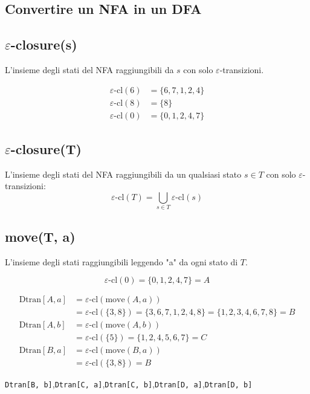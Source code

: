 \subsection{Convertire un NFA in un DFA}

\subsection*{$\varepsilon$-closure(s)}
L'insieme degli stati del NFA raggiungibili da $s$ con solo $\varepsilon$-transizioni.

\begin{align*}
  \varepsilon\text{-cl}(6) &= \{6, 7, 1, 2, 4\} \\
  \varepsilon\text{-cl}(8) &= \{8\} \\
  \varepsilon\text{-cl}(0) &= \{0, 1, 2, 4, 7\}
\end{align*}

\subsection*{$\varepsilon$-closure(T)}
L'insieme degli stati del NFA raggiungibili da un qualsiasi stato $s \in T$ con solo $\varepsilon$-transizioni:
\[
\varepsilon\text{-cl}(T) = \bigcup_{s \in T} \varepsilon\text{-cl}(s)
\]

\subsection*{move(T, a)}
L'insieme degli stati raggiungibili leggendo "a" da ogni stato di $T$.

\[
\varepsilon\text{-cl}(0) = \{0, 1, 2, 4, 7\} = A
\]

\begin{align*}
  \mathrm{Dtran}[A, a] &= \varepsilon\text{-cl}(\mathrm{move}(A, a))\\
        &= \varepsilon\text{-cl}(\{3, 8\}) = \{3, 6, 7, 1, 2, 4, 8\} = \{1, 2, 3, 4, 6, 7, 8\} = B \\
  \mathrm{Dtran}[A, b] &= \varepsilon\text{-cl}(\mathrm{move}(A, b))\\
        &= \varepsilon\text{-cl}(\{5\}) = \{1, 2, 4, 5, 6, 7\} = C \\
  \mathrm{Dtran}[B, a] &= \varepsilon\text{-cl}(\mathrm{move}(B, a))\\
        &= \varepsilon\text{-cl}(\{3, 8\}) = B
\end{align*}

\vspace{0.3cm}
\texttt{Dtran[B, b]},\quad \texttt{Dtran[C, a]},\quad \texttt{Dtran[C, b]},\quad \texttt{Dtran[D, a]},\quad \texttt{Dtran[D, b]}


